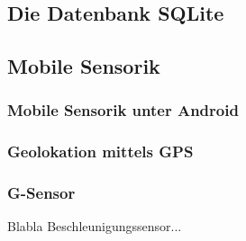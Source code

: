 \subsection{Die Datenbank SQLite}
\subsection{Mobile Sensorik} 
\subsubsection{Mobile Sensorik unter Android}
\subsubsection{Geolokation mittels \gls{GPS}}
\subsubsection{G-Sensor}
Blabla Beschleunigungssensor...
